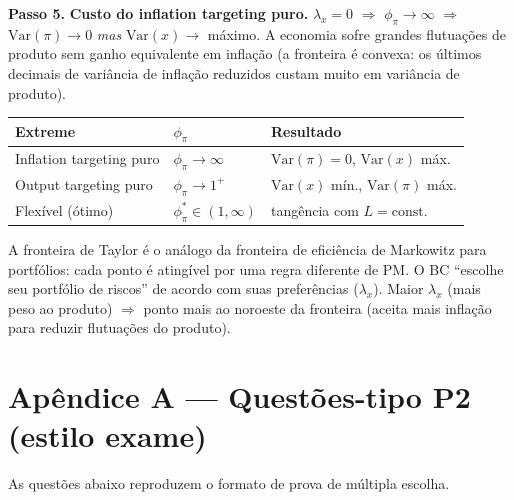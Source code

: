 \documentclass[12pt, a4paper]{article}
\begin{document}
\textbf{Passo 5.} \textbf{Custo do inflation targeting puro.}
$\lambda_x = 0$ $\Rightarrow$ $\phi_\pi\to\infty$ $\Rightarrow$
$\text{Var}(\pi)\to 0$ \emph{mas} $\text{Var}(x)\to$ máximo. A economia sofre
grandes flutuações de produto sem ganho equivalente em inflação (a fronteira é
convexa: os últimos decimais de variância de inflação reduzidos custam muito
em variância de produto).

\begin{resultbox}[title={Fronteira eficiente de PM (Q11)}]
\begin{center}
\begin{tabular}{lll}
\toprule
Extreme & $\phi_\pi$ & Resultado \\
\midrule
Inflation targeting puro & $\phi_\pi\to\infty$ & $\text{Var}(\pi)=0$, $\text{Var}(x)$ máx. \\
Output targeting puro & $\phi_\pi\to 1^+$ & $\text{Var}(x)$ mín., $\text{Var}(\pi)$ máx. \\
Flexível (ótimo) & $\phi_\pi^*\in(1,\infty)$ & tangência com $L=\text{const.}$ \\
\bottomrule
\end{tabular}
\end{center}
\end{resultbox}

\begin{provabox}[title={Curva de Taylor (1979) --- Para a Prova (Q11)}]
A fronteira de Taylor é o análogo da fronteira de eficiência de Markowitz para
portfólios: cada ponto é atingível por uma regra diferente de PM. O BC ``escolhe
seu portfólio de riscos'' de acordo com suas preferências ($\lambda_x$).
Maior $\lambda_x$ (mais peso ao produto) $\Rightarrow$ ponto mais ao noroeste
da fronteira (aceita mais inflação para reduzir flutuações do produto).
\end{provabox}


\newpage
\appendix
\renewcommand{\thesection}{Q-tipo \Alph{section}}
\section*{\color{cyanrbc} Apêndice A --- Questões-tipo P2 (estilo exame)}

As questões abaixo reproduzem o formato de prova de múltipla escolha.
\end{document}
